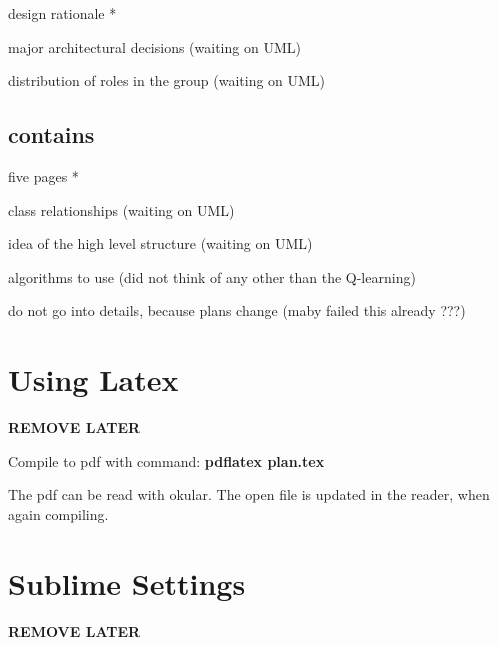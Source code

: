 \documentclass{article}
\begin{document}
design rationale * %

major architectural decisions (waiting on UML)

distribution of roles in the group (waiting on UML)


\subsection{contains}

five pages *

class relationships (waiting on UML)

idea of the high level structure (waiting on UML)

algorithms to use (did not think of any other than the Q-learning)

do not go into details, because plans change (maby failed this already ???)



\section{Using Latex}
\textbf{REMOVE LATER}

Compile to pdf with command: \textbf{pdflatex plan.tex}

The pdf can be read with okular.
The open file is updated in the reader, when again compiling.



\section{Sublime Settings}
\textbf{REMOVE LATER}

\end{document}
